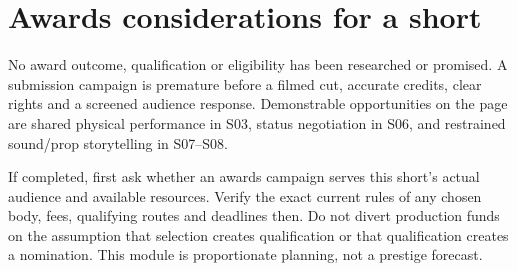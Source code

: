 \section{Awards considerations for a short}
No award outcome, qualification or eligibility has been researched or promised. A submission campaign is premature before a filmed cut, accurate credits, clear rights and a screened audience response. Demonstrable opportunities on the page are shared physical performance in S03, status negotiation in S06, and restrained sound/prop storytelling in S07–S08.

If completed, first ask whether an awards campaign serves this short's actual audience and available resources. Verify the exact current rules of any chosen body, fees, qualifying routes and deadlines then. Do not divert production funds on the assumption that selection creates qualification or that qualification creates a nomination. This module is proportionate planning, not a prestige forecast.
